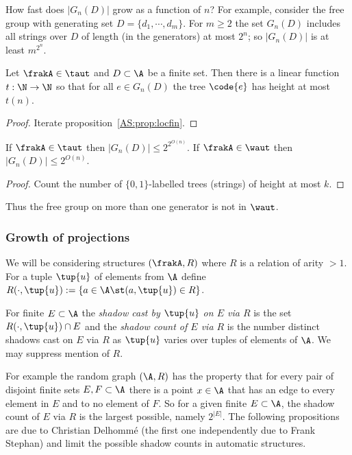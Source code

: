 How fast does $|G_n(D)|$ grow as a function of $n$?  For
example, consider the free group with generating
set $D = \{d_1, \cdots, d_m\}$. For $m \geq 2$ the set $G_n(D)$ includes all strings over $D$ of length (in the generators)
at most $2^n$; so  $|G_n(D)|$ is at least $m^{2^{n}}$.

\begin{proposition} \cite{KhNe95} 
 \label{prop:growth}
Let $\frakA \in \taut$ and $D \subset \A$ be a finite set. Then there is a
linear function $t:\N \rightarrow \N$ so that for all $e \in G_n(D)$ the tree $\code{e}$ has
height at most $t(n)$.
\end{proposition}
\begin{proof}
 Iterate proposition~\ref{AS:prop:locfin}.
\end{proof}

\begin{corollary} 
If $\frakA \in \taut$ then $|G_n(D)| \leq 2^{2^{O(n)}}$. If $\frakA \in \waut$ then 
$|G_n(D)| \leq 2^{O(n)}$.
\end{corollary}
\begin{proof}
Count the number of $\{0,1\}$-labelled trees (strings) of height at most $k$.
\end{proof}

Thus the free group on more than one generator is not in $\waut$.

\subsubsection*{Growth of projections}

We will be considering structures $(\frakA,R)$ where $R$ is a relation of arity $> 1$. For a tuple $\tup{u}$ of elements from $\A$ define
$R(\cdot,\tup{u}) := \{a \in \A \st (a,\tup{u}) \in R\}$.

\begin{definition}
For finite $E \subset \A$ the  {\em shadow cast by $\tup{u}$ on $E$ via $R$} is the set 
$R(\cdot,\tup{u}) \cap E$ and the {\em shadow count of $E$ via $R$} is the number distinct shadows
cast on $E$ via $R$ as $\tup{u}$ varies over tuples of elements of $\A$. We may suppress mention of $R$.
\end{definition}

For example the random graph $(\A,R)$ has the property that for every pair of disjoint finite sets $E,F \subset \A$ there is a point $x \in \A$ that has an edge to every element in $E$ and to no element of $F$. So for a given finite $E \subset \A$, the shadow count of $E$ via $R$ is 
the largest possible, namely $2^{|E|}$. The following propositions are due to Christian Delhomm{\'e} \cite{Delh04} (the first one independently due to Frank Stephan) and limit the possible shadow counts in automatic structures.

